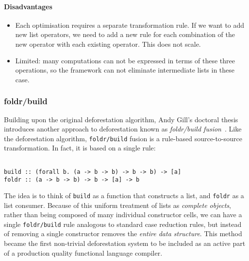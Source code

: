 \paragraph{Disadvantages}
\begin{itemize}
    \item Each optimisation requires a separate transformation rule. If we want
        to add new list operators, we need to add a new rule for each
        combination of the new operator with each existing operator. This does
        not scale.

    \item Limited: many computations can not be expressed in terms of these
        three operations, so the framework can not eliminate intermediate lists
        in these case.
\end{itemize}


\subsubsection{foldr/build}

Building upon the original deforestation algorithm, Andy Gill's doctoral thesis
introduces another approach to deforestation known as \emph{foldr/build
fusion}~\cite{Gill:1996tf,Gill:1993de}.
Like the deforestation algorithm, \texttt{foldr/build} fusion is a rule-based
source-to-source transformation. In fact, it is based on a single rule:
%
\begin{lstlisting}[style=Haskell,numbers=none,mathescape,caption={The \texttt{foldr/build} transformation}]
%\bf$\langle$ foldr/build fusion $\rangle$% forall g k z. foldr k z (build g) $\mapsto$ g k z

build :: (forall b. (a -> b -> b) -> b -> b) -> [a]
foldr :: (a -> b -> b) -> b -> [a] -> b
\end{lstlisting}

The idea is to think of \texttt{build} as a function that constructs a list, and
\texttt{foldr} as a list consumer. Because of this uniform treatment of lists as
\emph{complete objects}, rather than being composed of many individual
constructor cells, we can have a single \texttt{foldr/build} rule analogous to
standard case reduction rules, but instead of removing a single constructor
removes the \emph{entire data structure}. This method became the first
non-trivial deforestation system to be included as an active part of a
production quality functional language compiler.

